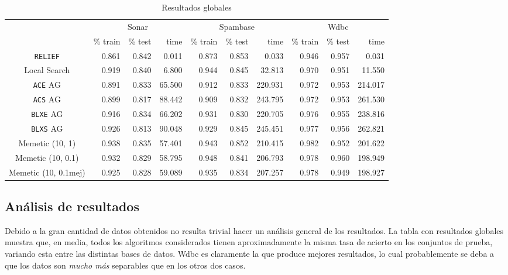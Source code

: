 \documentclass[11pt]{article}
\theoremstyle{plain}
\theoremstyle{definition}
\begin{document}
\begin{table}[H]
\centering
\caption{Resultados globales}
\label{tbl-glob}
\begin{tabular}{@{}crrrrrrrrr@{}}
  \toprule
  & \multicolumn{3}{c}{Sonar} & \multicolumn{3}{c}{Spambase} & \multicolumn{3}{c}{Wdbc}  \\
  \cmidrule(r){2-10}
           & \% train & \% test & time & \% train   & \% test   & time & \% train & \% test & time \\
  \midrule
\texttt{RELIEF}      & 0.861 & 0.842 & 0.011  & 0.873 & 0.853 & 0.033   & 0.946 & 0.957 & 0.031   \\
Local Search & 0.919 & 0.840 & 6.800  & 0.944 & 0.845 & 32.813  & 0.970 & 0.951 & 11.550  \\
\texttt{ACE} AG & 0.891 & 0.833 & 65.500 & 0.912 & 0.833 & 220.931 & 0.972 & 0.953 & 214.017 \\
\texttt{ACS} AG & 0.899 & 0.817 & 88.442 & 0.909 & 0.832 & 243.795 & 0.972 & 0.953 & 261.530 \\
\texttt{BLXE} AG & 0.916 & 0.834 & 66.202 & 0.931 & 0.830 & 220.705 & 0.976 & 0.955 & 238.816 \\
\texttt{BLXS} AG & 0.926 & 0.813 & 90.048 & 0.929 & 0.845 & 245.451 & 0.977 & 0.956 & 262.821 \\
Memetic (10, 1) & 0.938 & 0.835 & 57.401 & 0.943 & 0.852 & 210.415 & 0.982 & 0.952 & 201.622 \\
Memetic (10, 0.1) & 0.932 & 0.829 & 58.795 & 0.948 & 0.841 & 206.793 & 0.978 & 0.960 & 198.949 \\
Memetic (10, 0.1mej) & 0.925 & 0.828 & 59.089 & 0.935 & 0.834 & 207.257 & 0.978 & 0.949 & 198.927 \\
  \bottomrule
\end{tabular}
\end{table}

\subsection{Análisis de resultados}
Debido a la gran cantidad de datos obtenidos no resulta trivial hacer un análisis general de los resultados. La tabla con resultados globales muestra que, en media, todos los algoritmos considerados tienen aproximadamente la misma tasa de acierto en los conjuntos de prueba, variando esta entre las distintas bases de datos. Wdbc es claramente la que produce mejores resultados, lo cual probablemente se deba a que los datos son \textit{mucho más} separables que en los otros dos casos. \\
\end{document}

